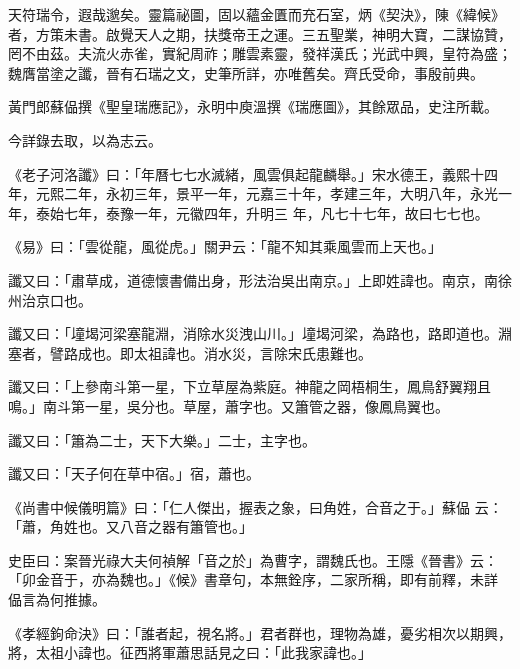 
\begin{pinyinscope}

 天符瑞令，遐哉邈矣。靈篇祕圖，固以蘊金匱而充石室，炳《契決》，陳《緯候》者，方策未書。啟覺天人之期，扶獎帝王之運。三五聖業，神明大寶，二謀協贊，罔不由茲。夫流火赤雀，實紀周祚；雕雲素靈，發祥漢氏；光武中興，皇符為盛；魏膺當塗之讖，晉有石瑞之文，史筆所詳，亦唯舊矣。齊氏受命，事殷前典。



 黃門郎蘇偘撰《聖皇瑞應記》，永明中庾溫撰《瑞應圖》，其餘眾品，史注所載。



 今詳錄去取，以為志云。



 《老子河洛讖》曰：「年曆七七水滅緒，風雲俱起龍麟舉。」宋水德王，義熙十四年，元熙二年，永初三年，景平一年，元嘉三十年，孝建三年，大明八年，永光一年，泰始七年，泰豫一年，元徽四年，升明三
 年，凡七十七年，故曰七七也。



 《易》曰：「雲從龍，風從虎。」關尹云：「龍不知其乘風雲而上天也。」



 讖又曰：「肅草成，道德懷書備出身，形法治吳出南京。」上即姓諱也。南京，南徐州治京口也。



 讖又曰：「墥堨河梁塞龍淵，消除水災洩山川。」墥堨河梁，為路也，路即道也。淵塞者，譬路成也。即太祖諱也。消水災，言除宋氏患難也。



 讖又曰：「上參南斗第一星，下立草屋為紫庭。神龍之岡梧桐生，鳳鳥舒翼翔且鳴。」南斗第一星，吳分也。草屋，蕭字也。又簫管之器，像鳳鳥翼也。



 讖又曰：「簫為二士，天下大樂。」二士，主字也。



 讖又曰：「天子何在草中宿。」宿，蕭也。



 《尚書中候儀明篇》曰：「仁人傑出，握表之象，曰角姓，合音之于。」蘇偘
 云：「蕭，角姓也。又八音之器有簫管也。」



 史臣曰：案晉光祿大夫何禎解「音之於」為曹字，謂魏氏也。王隱《晉書》云：「卯金音于，亦為魏也。」《候》書章句，本無銓序，二家所稱，即有前釋，未詳偘言為何推據。



 《孝經鉤命決》曰：「誰者起，視名將。」君者群也，理物為雄，憂劣相次以期興，將，太祖小諱也。征西將軍蕭思話見之曰：「此我家諱也。」




\end{pinyinscope}
